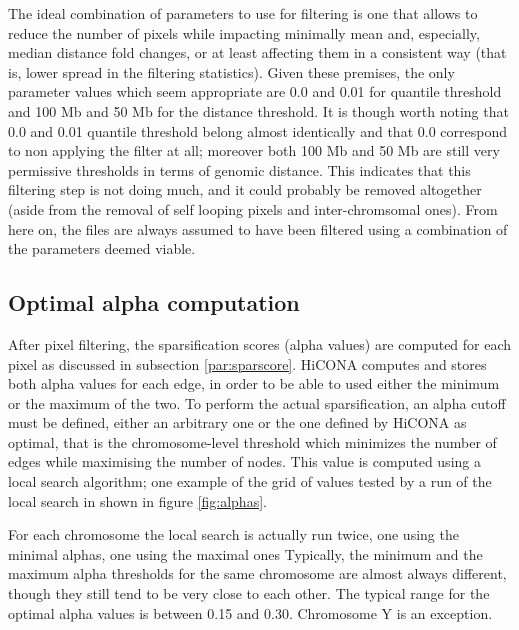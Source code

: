The ideal combination of parameters to use for filtering is one that allows to reduce the number of pixels while impacting minimally mean and, especially, median distance fold changes, or at least affecting them in a consistent way (that is, lower spread in the filtering statistics). Given these premises, the only parameter values which seem appropriate are 0.0 and 0.01 for quantile threshold and 100 Mb and 50 Mb for the distance threshold. It is though worth noting that 0.0 and 0.01 quantile threshold belong almost identically and that 0.0 correspond to non applying the filter at all; moreover both 100 Mb and 50 Mb are still very permissive thresholds in terms of genomic distance. This indicates that this filtering step is not doing much, and it could probably be removed altogether (aside from the removal of self looping pixels and inter-chromsomal ones). From here on, the files are always assumed to have been filtered using a combination of the parameters deemed viable.


\subsection{Optimal alpha computation}

After pixel filtering, the sparsification scores (alpha values) are computed for each pixel as discussed in subsection \ref{par:sparscore}. HiCONA computes and stores both alpha values for each edge, in order to be able to used either the minimum or the maximum of the two. To perform the actual sparsification, an alpha cutoff must be defined, either an arbitrary one or the one defined by HiCONA as optimal, that is the chromosome-level threshold which minimizes the number of edges while maximising the number of nodes. This value is computed using a local search algorithm; one example of the grid of values tested by a run of the local search in shown in figure \ref{fig:alphas}.

For each chromosome the local search is actually run twice, one using the minimal alphas, one using the maximal ones
Typically, the minimum and the maximum alpha thresholds for the same chromosome are almost always different, though they still tend to be very close to each other. The typical range for the optimal alpha values is between 0.15 and 0.30. Chromosome Y is an exception. 

